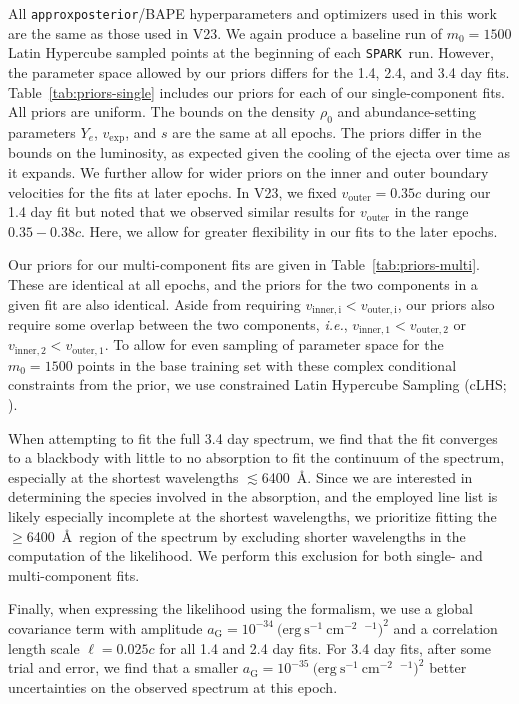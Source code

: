 \documentclass[twocolumn,twocolappendix]{aastex63}
\def\SPARK{\texttt{SPARK}}
\def\ie{{\it i.e.}}
\begin{document}
All \texttt{approxposterior}/BAPE hyperparameters and optimizers used in this work are the same as those used in V23. We again produce a baseline run of $m_{0} = 1500$ Latin Hypercube sampled points at the beginning of each \SPARK~run. However, the parameter space allowed by our priors differs for the 1.4, 2.4, and 3.4 day fits. Table~\ref{tab:priors-single} includes our priors for each of our single-component fits. All priors are uniform. The bounds on the density $\rho_0$ and abundance-setting parameters $Y_e$, $v_{\mathrm{exp}}$, and $s$ are the same at all epochs. The priors differ in the bounds on the luminosity, as expected given the cooling of the ejecta over time as it expands. We further allow for wider priors on the inner and outer boundary velocities for the fits at later epochs. In V23, we fixed $v_{\mathrm{outer}} = 0.35c$ during our 1.4 day fit but noted that we observed similar results for $v_{\mathrm{outer}}$ in the range $0.35 - 0.38c$. Here, we allow for greater flexibility in our fits to the later epochs.
    
Our priors for our multi-component fits are given in Table~\ref{tab:priors-multi}. These are identical at all epochs, and the priors for the two components in a given fit are also identical. Aside from requiring $v_{\mathrm{inner,i}} < v_{\mathrm{outer,i}}$, our priors also require some overlap between the two components, \ie, $v_{\mathrm{inner},1} < v_{\mathrm{outer},2}$ or $v_{\mathrm{inner},2} < v_{\mathrm{outer},1}$. To allow for even sampling of parameter space for the $m_0 = 1500$ points in the base training set with these complex conditional constraints from the prior, we use constrained Latin Hypercube Sampling (cLHS; \citealt{petelet09}).
    
When attempting to fit the full 3.4 day spectrum, we find that the fit converges to a blackbody with little to no absorption to fit the continuum of the spectrum, especially at the shortest wavelengths $\lesssim$6400~\AA. Since we are interested in determining the species involved in the absorption, and the employed line list is likely especially incomplete at the shortest wavelengths, we prioritize fitting the $\geqslant$6400~\AA~region of the spectrum by excluding shorter wavelengths in the computation of the likelihood. We perform this exclusion for both single- and multi-component fits.

Finally, when expressing the likelihood using the \cite{czekala15} formalism, we use a global covariance term with amplitude $a_{\mathrm{G}} = 10^{-34}~(\mathrm{erg~s^{-1}~cm^{-2}}$~\text{\AA}${}^{-1})^{2}$ and a correlation length scale $\ell = 0.025c$ for all 1.4 and 2.4 day fits. For 3.4 day fits, after some trial and error, we find that a smaller $a_{\mathrm{G}} = 10^{-35}~(\mathrm{erg~s^{-1}~cm^{-2}}$~\text{\AA}${}^{-1})^{2}$ better uncertainties on the observed spectrum at this epoch.
\end{document}
